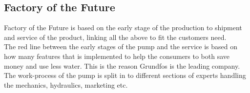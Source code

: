 \subsection{Factory of the Future}

Factory of the Future is based on the early stage of the production to shipment and service of the product, linking all the above to fit the customers need.\\
The red line between the early stages of the pump and the service is based on how many features that is implemented to help the consumers to both save money and use less water. This is the reason Grundfos is the leading company.
The work-process of the pump is split in to different sections of experts handling the mechanics, hydraulics, marketing etc.\\


